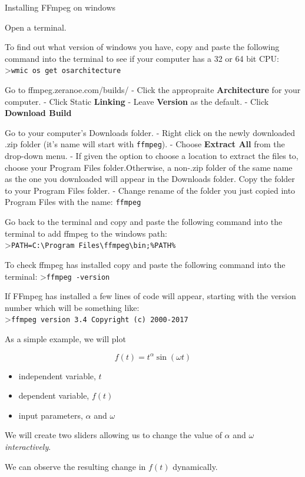 \documentclass[11pt]{article}
\providecommand{\tightlist}{%
      \setlength{\itemsep}{0pt}\setlength{\parskip}{0pt}}
\begin{document}
    Installing FFmpeg on windows

Open a terminal.

To find out what version of windows you have, copy and paste the
following command into the terminal to see if your computer has a 32 or
64 bit CPU: \textgreater{}\texttt{wmic\ os\ get\ osarchitecture}

Go to ffmpeg.zeranoe.com/builds/ - Click the appropraite
\textbf{Architecture} for your computer. - Click Static \textbf{Linking}
- Leave \textbf{Version} as the default. - Click \textbf{Download Build}

Go to your computer's Downloads folder. - Right click on the newly
downloaded .zip folder (it's name will start with \texttt{ffmpeg}). -
Choose \textbf{Extract All} from the drop-down menu. - If given the
option to choose a location to extract the files to, choose your Program
Files folder.Otherwise, a non-.zip folder of the same name as the one
you downloaded will appear in the Downloads folder. Copy the folder to
your Program Files folder. - Change rename of the folder you just copied
into Program Files with the name: \texttt{ffmpeg}

Go back to the terminal and copy and paste the following command into
the terminal to add ffmpeg to the windows path:
\textgreater{}\texttt{PATH=C:\textbackslash{}Program\ Files\textbackslash{}ffmpeg\textbackslash{}bin;\%PATH\%}

To check ffmpeg has installed copy and paste the following command into
the terminal: \textgreater{}\texttt{ffmpeg\ -version}

If FFmpeg has installed a few lines of code will appear, starting with
the version number which will be something like:
\textgreater{}\texttt{ffmpeg\ version\ 3.4\ Copyright\ (c)\ 2000-2017}

    As a simple example, we will plot

\[
f(t) = t^{\alpha} \sin(\omega t)
\]

\begin{itemize}
\tightlist
\item
  independent variable, \(t\)
\item
  dependent variable, \(f(t)\)
\item
  input parameters, \(\alpha\) and \(\omega\)
\end{itemize}

We will create two sliders allowing us to change the value of \(\alpha\)
and \(\omega\) \emph{interactively}.

We can observe the resulting change in \(f(t)\) dynamically.
\end{document}
